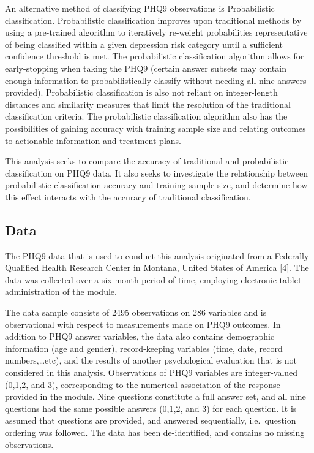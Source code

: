 \documentclass[12pt,]{article}
\begin{document}
An alternative method of classifying PHQ9 observations is Probabilistic
classification. Probabilistic classification improves upon traditional
methods by using a pre-trained algorithm to iteratively re-weight
probabilities representative of being classified within a given
depression risk category until a sufficient confidence threshold is met.
The probabilistic classification algorithm allows for early-stopping
when taking the PHQ9 (certain answer subsets may contain enough
information to probabilistically classify without needing all nine
answers provided). Probabilistic classification is also not reliant on
integer-length distances and similarity measures that limit the
resolution of the traditional classification criteria. The probabilistic
classification algorithm also has the possibilities of gaining accuracy
with training sample size and relating outcomes to actionable
information and treatment plans.

This analysis seeks to compare the accuracy of traditional and
probabilistic classification on PHQ9 data. It also seeks to investigate
the relationship between probabilistic classification accuracy and
training sample size, and determine how this effect interacts with the
accuracy of traditional classification.

\hypertarget{data}{%
\subsection{Data}\label{data}}

The PHQ9 data that is used to conduct this analysis originated from a
Federally Qualified Health Research Center in Montana, United States of
America {[}4{]}. The data was collected over a six month period of time,
employing electronic-tablet administration of the module.

The data sample consists of 2495 observations on 286 variables and is
observational with respect to measurements made on PHQ9 outcomes. In
addition to PHQ9 answer variables, the data also contains demographic
information (age and gender), record-keeping variables (time, date,
record numbers,\ldots{}etc), and the results of another psychological
evaluation that is not considered in this analysis. Observations of PHQ9
variables are integer-valued (0,1,2, and 3), corresponding to the
numerical association of the response provided in the module. Nine
questions constitute a full answer set, and all nine questions had the
same possible answers (0,1,2, and 3) for each question. It is assumed
that questions are provided, and answered sequentially, i.e.~question
ordering was followed. The data has been de-identified, and contains no
missing observations.
\end{document}
